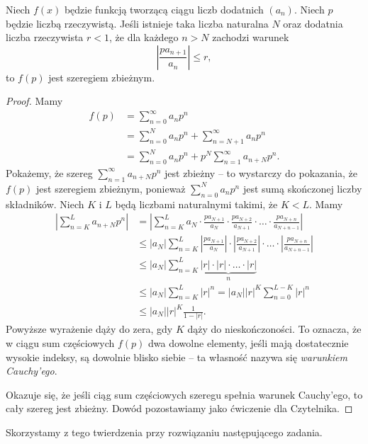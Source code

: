 \documentclass[shortabstract]{imthesis}
\begin{document}
\begin{theorem} \label{thm:alembert}
    Niech $f(x)$ będzie funkcją tworzącą ciągu liczb dodatnich $(a_n)$. Niech $p$ będzie liczbą rzeczywistą. Jeśli istnieje taka liczba naturalna $N$ oraz dodatnia liczba rzeczywista $r < 1$, że dla każdego $n > N$ zachodzi warunek
    $$
    \left|\frac{pa_{n+1}}{a_n}\right| \leq r,
    $$
    to $f(p)$ jest szeregiem zbieżnym.
\end{theorem}
\begin{proof}
    Mamy
    \begin{align*}
        f(p) &= \sum_{n=0}^\infty a_np^n \\
        &= \sum_{n=0}^N a_np^n + \sum_{n=N+1}^\infty a_np^n \\
        &= \sum_{n=0}^N a_np^n + p^N\sum_{n=1}^\infty a_{n+N}p^n.
    \end{align*}
    Pokażemy, że szereg $\sum_{n=1}^\infty a_{n+N}p^n$ jest zbieżny -- to wystarczy do pokazania, że $f(p)$ jest szeregiem zbieżnym, ponieważ $\sum_{n=0}^N a_np^n$ jest sumą skończonej liczby składników. Niech $K$ i $L$ będą liczbami naturalnymi takimi, że $K < L$. Mamy
    \begin{align*}
        \left|\sum_{n=K}^L a_{n+N}p^n\right| &= \left|\sum_{n=K}^L a_N \cdot \frac{pa_{N+1}}{a_N} \cdot \frac{pa_{N+2}}{a_{N+1}} \cdot \ldots \cdot \frac{pa_{N+n}}{a_{N+n-1}}\right| \\
        &\leq |a_N|\sum_{n=K}^L \left|\frac{pa_{N+1}}{a_N}\right| \cdot \left|\frac{pa_{N+2}}{a_{N+1}}\right| \cdot \ldots \cdot \left|\frac{pa_{N+n}}{a_{N+n-1}} \right| \\
        &\leq |a_N|\sum_{n=K}^L \underbrace{|r| \cdot |r| \cdot \ldots \cdot |r|}_n \\
        &\leq |a_N|\sum_{n=K}^L |r|^n = |a_N||r|^K\sum_{n=0}^{L-K} |r|^n \\
        &\leq |a_N||r|^K \frac{1}{1-|r|}.
    \end{align*}
    Powyższe wyrażenie dąży do zera, gdy $K$ dąży do nieskończoności. To oznacza, że w ciągu sum częściowych $f(p)$ dwa dowolne elementy, jeśli mają dostatecznie wysokie indeksy, są dowolnie blisko siebie -- ta własność nazywa się \emph{warunkiem Cauchy'ego}.

    Okazuje się, że jeśli ciąg sum częściowych szeregu spełnia warunek Cauchy'ego, to cały szereg jest zbieżny. Dowód pozostawiamy jako ćwiczenie dla Czytelnika.
\end{proof}

Skorzystamy z tego twierdzenia przy rozwiązaniu następującego zadania.
\end{document}
